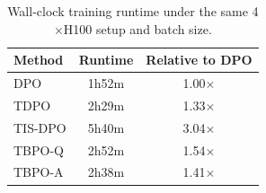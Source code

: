 \documentclass{article}
\theoremstyle{plain}
\theoremstyle{definition}
\theoremstyle{remark}
\begin{document}
\begin{table}[h!]
\centering
\begin{tabular}{lcc}
\toprule
\textbf{Method} & \textbf{Runtime} & \textbf{Relative to DPO} \\
\midrule
DPO & 1h52m & 1.00$\times$ \\
TDPO & 2h29m & 1.33$\times$ \\
TIS-DPO & 5h40m & 3.04$\times$ \\
TBPO-Q & 2h52m & 1.54$\times$ \\
TBPO-A & 2h38m & 1.41$\times$ \\
\bottomrule
\end{tabular}
\caption{Wall-clock training runtime under the same 4$\times$H100 setup and batch size.}
\label{tab:runtime}
\end{table}

\end{document}
